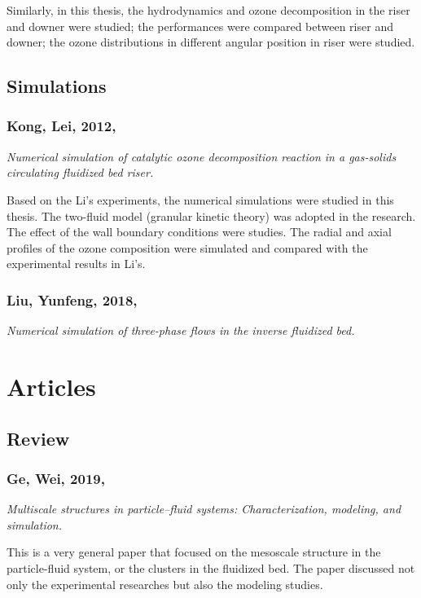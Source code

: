 \documentclass[11pt]{report}
\begin{document}
Similarly, in this thesis, the hydrodynamics and ozone decomposition in the riser and downer were studied;
the performances were compared between riser and downer; 
the ozone distributions in different angular position in riser were studied.

\section{Simulations}
%
%
\subsection[Kong, Lei, 2012]{Kong, Lei, 2012, \cite{konglei2012}}
\textit{Numerical simulation of catalytic ozone decomposition reaction in a gas-solids circulating fluidized bed riser.}

Based on the Li's experiments, the numerical simulations were studied in this thesis. 
The two-fluid model (granular kinetic theory) was adopted in the research. 
The effect of the wall boundary conditions were studies. 
The radial and axial profiles of the ozone composition were simulated and compared with the experimental results in Li's.

%
%
\subsection[Liu, Yunfeng, 2018]{Liu, Yunfeng, 2018, \cite{liuyf2018}}
\textit{Numerical simulation of three-phase flows in the inverse fluidized bed.}

\chapter{Articles}
\section{Review}
%
%
\subsection[Ge, Wei, 2019]{Ge, Wei, 2019, \cite{ge2019multiscale}}
\textit{Multiscale structures in particle--fluid systems: Characterization, modeling, and simulation.}

This is a very general paper that focused on the mesoscale structure in the particle-fluid system, or the clusters in the fluidized bed. 
The paper discussed not only the experimental researches but also the modeling studies. 
%
%
\end{document}
